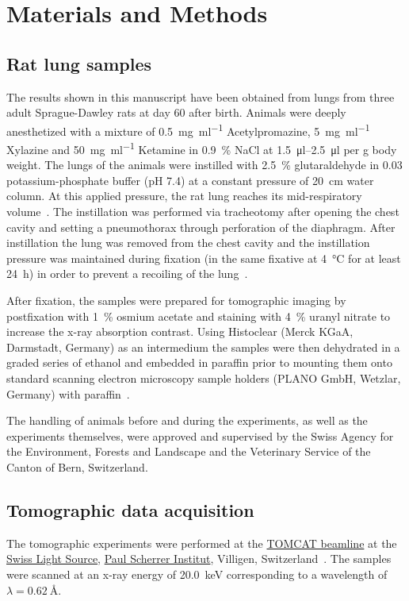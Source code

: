 \documentclass[twoside,paper=a4,abstract=true,english,DIVcalc]{scrartcl}
\begin{document}
\section{Materials and Methods}
\label{sec:materials and methods}
\subsection{Rat lung samples}
The results shown in this manuscript have been obtained from lungs from three adult Sprague-Dawley rats at day 60 after birth. Animals were deeply anesthetized with a mixture of %
\SI{0.5}{\milli\gram\per\milli\litre} Acetylpromazine, %
\SI{5}{\milli\gram\per\milli\litre} Xylazine and %
\SI{50}{\milli\gram\per\milli\litre} Ketamine in %
\SI{0.9}{\percent} NaCl at \SIrange{1.5}{2.5}{\micro\litre} per \si{\gram} body weight. The lungs of the animals were instilled with \SI{2.5}{\percent} glutaraldehyde in \SI{0.03}{\Molar} potassium-phosphate buffer (pH 7.4) at a constant pressure of \SI{20}{\centi\meter} water column. At this applied pressure, the rat lung reaches its mid-respiratory volume~\cite{Schittny1998}. The instillation was performed via tracheotomy after opening the chest cavity and setting a pneumothorax through perforation of the diaphragm. After instillation the lung was removed from the chest cavity and the instillation pressure was maintained during fixation (in the same fixative at \SI{4}{\celsius} for at least \SI{24}{\hour}) in order to prevent a recoiling of the lung~\cite{Tschanz2002}.

After fixation, the samples were prepared for tomographic imaging by postfixation with \SI{1}{\percent} osmium acetate and staining with \SI{4}{\percent} uranyl nitrate to increase the x-ray absorption contrast. Using Histoclear (Merck KGaA, Darmstadt, Germany) as an intermedium the samples were then dehydrated in a graded series of ethanol and embedded in paraffin prior to mounting them onto standard scanning electron microscopy sample holders (PLANO GmbH, Wetzlar, Germany) with paraffin~\cite{Tsuda2008}.

The handling of animals before and during the experiments, as well as the experiments themselves, were approved and supervised by the Swiss Agency for the Environment, Forests and Landscape and the Veterinary Service of the Canton of Bern, Switzerland.

\subsection{Tomographic data acquisition}
The tomographic experiments were performed at the \href{http://www.psi.ch/sls/tomcat/}{TOMCAT beamline} at the \href{http://www.psi.ch/sls/}{Swiss Light Source}, \href{http://www.psi.ch/}{Paul Scherrer Institut}, Villigen, Switzerland~\cite{Stampanoni2006a}. The samples were scanned at an x-ray energy of \SI{20.0}{\kilo\electronvolt} corresponding to a wavelength of \(\lambda=\SI{0.62}{\angstrom}\). %
\end{document}
